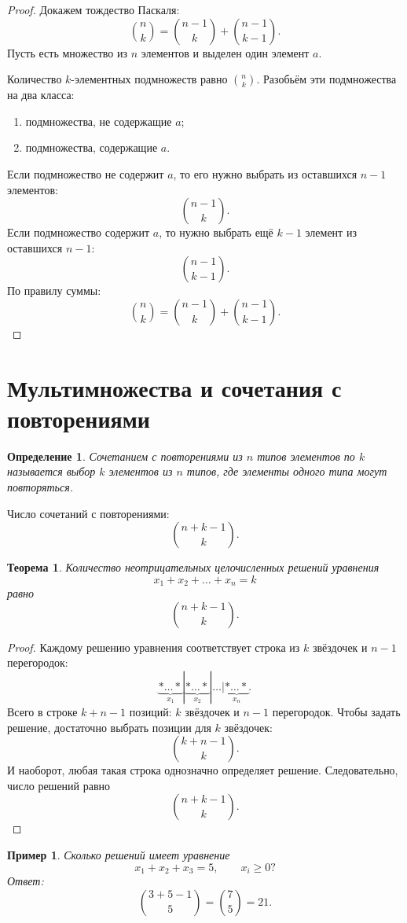 \documentclass[12pt,a4paper]{article}
\newtheorem{theorem}{Теорема}
\newtheorem{definition}{Определение}
\newtheorem{example}{Пример}
\begin{document}
\begin{proof}
Докажем тождество Паскаля:
\[
\binom{n}{k} = \binom{n-1}{k} + \binom{n-1}{k-1}.
\]
Пусть есть множество из $n$ элементов и выделен один элемент $a$.

Количество $k$-элементных подмножеств равно $\binom{n}{k}$. Разобьём эти подмножества на два класса:
\begin{enumerate}
    \item подмножества, не содержащие $a$;
    \item подмножества, содержащие $a$.
\end{enumerate}
Если подмножество не содержит $a$, то его нужно выбрать из оставшихся $n-1$ элементов:
\[
\binom{n-1}{k}.
\]
Если подмножество содержит $a$, то нужно выбрать ещё $k-1$ элемент из оставшихся $n-1$:
\[
\binom{n-1}{k-1}.
\]
По правилу суммы:
\[
\binom{n}{k} = \binom{n-1}{k} + \binom{n-1}{k-1}.
\]
\end{proof}

\section{Мультимножества и сочетания с повторениями}

\begin{definition}
Сочетанием с повторениями из $n$ типов элементов по $k$ называется выбор $k$ элементов из $n$ типов, где элементы одного типа могут повторяться.
\end{definition}

Число сочетаний с повторениями:
\[
\binom{n+k-1}{k}.
\]

\begin{theorem}
Количество неотрицательных целочисленных решений уравнения
\[
x_1+x_2+\dots+x_n = k
\]
равно
\[
\binom{n+k-1}{k}.
\]
\end{theorem}

\begin{proof}
Каждому решению уравнения соответствует строка из $k$ звёздочек и $n-1$ перегородок:
\[
\underbrace{* \dots *}_{x_1}
|
\underbrace{* \dots *}_{x_2}
|
\dots
|
\underbrace{* \dots *}_{x_n}.
\]
Всего в строке $k+n-1$ позиций: $k$ звёздочек и $n-1$ перегородок. Чтобы задать решение, достаточно выбрать позиции для $k$ звёздочек:
\[
\binom{k+n-1}{k}.
\]
И наоборот, любая такая строка однозначно определяет решение. Следовательно, число решений равно
\[
\binom{n+k-1}{k}.
\]
\end{proof}

\begin{example}
Сколько решений имеет уравнение
\[
x_1+x_2+x_3 = 5,\qquad x_i \ge 0?
\]
Ответ:
\[
\binom{3+5-1}{5} = \binom{7}{5} = 21.
\]
\end{example}
\end{document}

